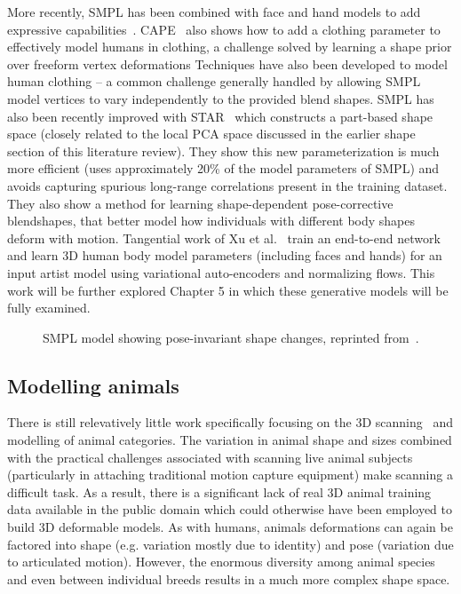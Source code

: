More recently, SMPL has been combined with face and hand models to add expressive capabilities~\cite{xiang19monocular, joo18total, pavlakos19expressive}. CAPE~\cite{CAPE:CVPR:20} also shows how to add a clothing parameter to effectively model humans in clothing, a challenge solved by learning a shape prior over freeform vertex deformations Techniques have also been developed to model human clothing -- a common challenge generally handled by allowing SMPL model vertices to vary independently to the provided blend shapes. SMPL has also been recently improved with STAR~\cite{STAR:2020} which constructs a part-based shape space (closely related to the local PCA space discussed in the earlier shape section of this literature review). They show this new parameterization is much more efficient (uses approximately 20\% of the model parameters of SMPL) and avoids capturing spurious long-range correlations present in the training dataset. They also show a method for learning shape-dependent pose-corrective blendshapes, that better model how individuals with different body shapes deform with motion. Tangential work of Xu et al.~\cite{ghum-ghuml} train an end-to-end network and learn 3D human body model parameters (including faces and hands) for an input artist model using variational auto-encoders and normalizing flows. This work will be further explored Chapter 5 in which these generative models will be fully examined. 

\begin{figure}[H] %
    \caption{SMPL model showing pose-invariant shape changes, reprinted from~\cite{loper15smpl}.}
    \label{fig:smpl_model}
\end{figure}

\subsection{Modelling animals}

There is still relevatively little work specifically focusing on the 3D scanning~\cite{xxx} and modelling of animal categories. The variation in animal shape and sizes combined with the practical challenges associated with scanning live animal subjects (particularly in attaching traditional motion capture equipment) make scanning a difficult task. As a result, there is a significant lack of real 3D animal training data available in the public domain which could otherwise have been employed to build 3D deformable models. As with humans, animals deformations can again be factored into shape (e.g. variation mostly due to identity) and pose (variation due to articulated motion). However, the enormous diversity among animal species and even between individual breeds results in a much more complex shape space.

